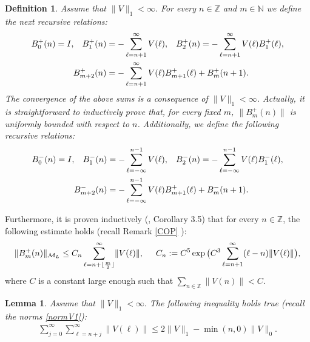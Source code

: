 \documentclass[12pt,oneside,onecolumn,open]{article}
\newtheorem{defi}[teo]{Definition}
\newtheorem{lema}[teo]{Lemma}
\begin{document}
\begin{defi} \label{B+}
Assume that $\|  V\|_1  < \infty.$ For every $n\in \mathbb{Z}$ and $m\in \mathbb{N}$ we define the next recursive relations:
\begin{align}
B_0^+(n) = I ,  \hspace{.3cm}B^+_1(n)&=-\sum_{\ell =n+1}^\infty  V(\ell),  \hspace{0.3cm} 
    B_2^+(n) =-\sum_{\ell =n+1}^\infty  V(\ell ) B_1^+(\ell ),  \\
    B_{m+2}^+(n)&=-\sum_{\ell =n+1}^\infty V(\ell )B_{m+1}^+(\ell ) +B_m^+(n+1).
\end{align}
The convergence of the above sums is a consequence of $ \| V \|_1 < \infty$. Actually, it is straightforward to inductively  prove that, for every  fixed  $ m   $, $   \| B^{+}_{m}(n)\|  $ is uniformly bounded with respect to $n $.     Additionally, we define the following recursive relations:
\begin{align}
  B_0^{-}(n) = I, \hspace{.3cm}  B^-_1(n)&=-\sum_{\ell =-\infty}^{n-1} V(\ell ), \hspace{.3cm}
    B_2^-(n) =-\sum_{\ell =-\infty}^{n-1}  V(\ell ) B_1^-(\ell ), \\
    B_{m+2}^-(n)&=-\sum_{\ell=-\infty}^{n-1} V(\ell )B_{m+1}^+(\ell ) +B_m^-(n+1).
\end{align}
    
\end{defi}
Furthermore, it is proven inductively (\cite{sher2025scatteringtheorydifferenceequations}, Corollary 3.5) that for every $n \in \mathbb{Z}$, the following estimate holds (recall Remark \ref{COP} ):
\begin{align}\label{SumaBs}
    \lVert B_m^+(n)\rVert_{\mathcal{M}_L} \leq C_n \sum_{\ell=n+\lfloor\frac{m}{2}\rfloor}^\infty \lVert V(\ell ) \rVert ,  \hspace{.5cm}
     C_n:=C^5\exp\big(C^3\sum_{\ell =n+1}^\infty (\ell-n)\lVert V(\ell )\rVert \big) ,    \end{align}
where $C$ is a constant large enough such that $\sum_{n\in \mathbb{Z}}\lVert V(n)\rVert <C$. 

\begin{lema}\label{LemmaSumVs}   Assume that $\|  V\|_1  < \infty.$  The following inequality holds true (recall the norms \eqref{normV1}):
\begin{align}
\sum _{j=0}^{\infty}\sum _{\ell =n+j}^{\infty}\|V(\ell )\| \leq 2 \| V  \|_{1}  -  \min(n, 0) \| V \|_0. 
\end{align}



\end{lema}
\end{document}
